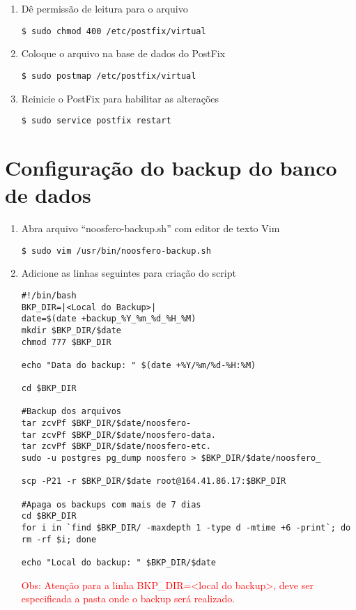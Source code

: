 \begin{enumerate}[label=\alph*)]
\item Dê permissão de leitura para o arquivo
\begin{lstlisting}
$ sudo chmod 400 /etc/postfix/virtual
\end{lstlisting}

\item Coloque o arquivo na base de dados do PostFix
\begin{lstlisting}
$ sudo postmap /etc/postfix/virtual
\end{lstlisting}

\item Reinicie o PostFix para habilitar as alterações
\begin{lstlisting}
$ sudo service postfix restart
\end{lstlisting}

\end{enumerate}

\section{Configuração do backup do banco de dados}

\begin{enumerate}[label=\alph*)]

\item Abra arquivo “noosfero-backup.sh” com editor de texto Vim
\begin{lstlisting}
$ sudo vim /usr/bin/noosfero-backup.sh
\end{lstlisting}

\item Adicione as linhas seguintes para criação do script
\begin{lstlisting}[style=base]
#!/bin/bash
BKP_DIR=|<Local do Backup>|
date=$(date +backup_%Y_%m_%d_%H_%M)
mkdir $BKP_DIR/$date
chmod 777 $BKP_DIR

echo "Data do backup: " $(date +%Y/%m/%d-%H:%M)

cd $BKP_DIR

#Backup dos arquivos
tar zcvPf $BKP_DIR/$date/noosfero-
tar zcvPf $BKP_DIR/$date/noosfero-data.
tar zcvPf $BKP_DIR/$date/noosfero-etc.
sudo -u postgres pg_dump noosfero > $BKP_DIR/$date/noosfero_

scp -P21 -r $BKP_DIR/$date root@164.41.86.17:$BKP_DIR

#Apaga os backups com mais de 7 dias
cd $BKP_DIR
for i in `find $BKP_DIR/ -maxdepth 1 -type d -mtime +6 -print`; do rm -rf $i; done

echo "Local do backup: " $BKP_DIR/$date
\end{lstlisting}

\textcolor{red}{{\scriptsize Obs: Atenção para a linha  BKP\_DIR=<local do backup>, deve ser especificada a pasta onde o backup será realizado.}}

\end{enumerate}

